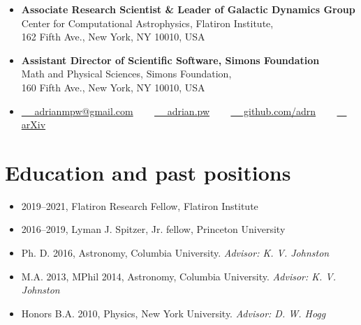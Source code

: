 \documentclass[12pt, letterpaper]{apw-cv}
\begin{document}
\thispagestyle{empty}\sloppy\sloppypar




\begin{itemize}
  \item
    \textbf{Associate Research Scientist \& Leader of Galactic Dynamics Group} \\
    Center for Computational Astrophysics, Flatiron Institute, \\
    162 Fifth Ave., New York, NY 10010, USA
  \item \textbf{Assistant Director of Scientific Software, Simons Foundation}\\
    Math and Physical Sciences, Simons Foundation, \\
    160 Fifth Ave., New York, NY 10010, USA
  \item
    \href{mailto:adrianmpw@gmail.com}{\faEnvelope ~~ adrianmpw@gmail.com}
    ~~~
	\href{http://adrian.pw}{\faExternalLink* ~~ adrian.pw}
    ~~~
	\href{https://github.com/adrn}{\faGithub ~~ github.com/adrn}
    ~~~
    \href{\arxivurl}{\faFile ~~ arXiv}
\end{itemize}




\section*{Education and past positions}
	\begin{itemize}
        \item 2019--2021, Flatiron Research Fellow, Flatiron Institute
        \item 2016--2019, Lyman J. Spitzer, Jr. fellow, Princeton University
	\item Ph. D. 2016, Astronomy, Columbia University.
		{\it Advisor: K. V. Johnston}
	\item M.A. 2013, MPhil 2014, Astronomy, Columbia University.
		{\it Advisor: K. V. Johnston}
	\item Honors B.A. 2010, Physics, New York University.
		{\it Advisor: D. W. Hogg}
	\end{itemize}
\end{document}
